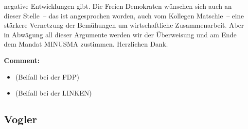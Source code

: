 \documentclass{article}
\begin{document}
negative Entwicklungen gibt. Die Freien Demokraten wünschen sich auch an dieser Stelle – das ist angesprochen worden, auch vom Kollegen Matschie – eine stärkere Vernetzung der Bemühungen um wirtschaftliche Zusammenarbeit. Aber in Abwägung all dieser Argumente werden wir der Überweisung und am Ende dem Mandat MINUSMA zustimmen. Herzlichen Dank.  

\noindent\textbf{Comment:}
\begin{itemize}
    \setlength\itemsep{-3pt}
    \item (Beifall bei der FDP)
    \setlength\itemsep{-3pt}
    \item (Beifall bei der LINKEN)
\end{itemize}
\subsection{Vogler}
\end{document}
